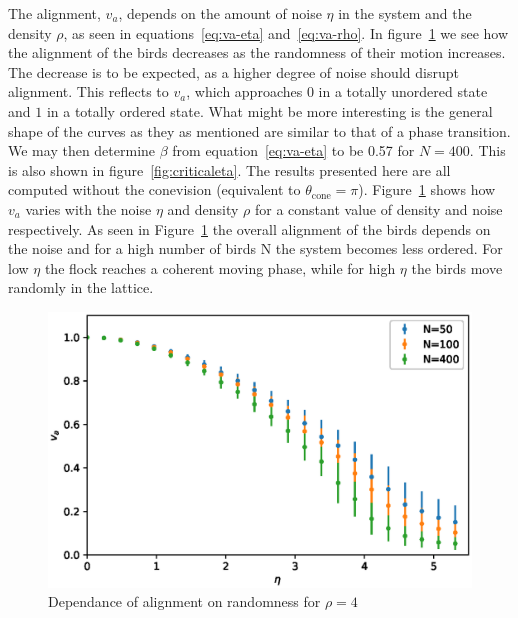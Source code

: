 \documentclass[twoside,twocolumn]{article}
\begin{document}
The alignment, $v_a$, depends on the amount of noise $\eta$ in the system 
and the density $\rho$, as seen in equations~\eqref{eq:va-eta} and~\eqref{eq:va-rho}.
In figure~\ref{fig:va_over_eta} we see how the alignment of 
the birds decreases as the randomness of their motion increases. The decrease 
is to be expected, as a higher degree of noise should disrupt alignment. 
This reflects to $v_a$, which approaches $0$ in a totally unordered state and $1$
in a totally ordered state.
What might be more interesting is the general shape of the curves as they as mentioned are similar to
that of a phase transition. We may then 
determine $\beta$ from equation~\eqref{eq:va-eta} to be 0.57 for $N=400$. This is also shown in figure~\ref{fig:criticaleta}. The results presented here 
are all computed without the conevision (equivalent to $\theta_{\text{cone}} = \pi$). 
Figure~\ref{fig:va_over_eta} shows how $v_a$ varies with the noise $\eta$ and 
density $\rho$ for a constant value of density and noise respectively.
As seen in Figure~\ref{fig:va_over_eta} the overall alignment of the birds depends 
on the noise and for a high number of birds N the system becomes less ordered. 
For low $\eta$ the flock reaches a coherent moving phase, while for high $\eta$ 
the birds move randomly in the lattice.  


\begin{figure}[!htb]
  \centering
  \includegraphics[width=\columnwidth]{va_over_eta}
  \caption{Dependance of alignment on randomness for $\rho = 4$}\label{fig:va_over_eta}
\end{figure}
\end{document}
